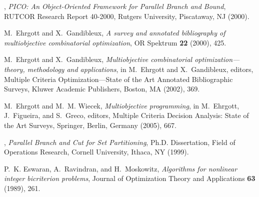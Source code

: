\begin{thebibliography}{9}



, {\em
PICO: An Object-Oriented Framework for Parallel Branch and Bound},
RUTCOR Research Report 40-2000, Rutgers University, Piscataway, NJ (2000).

{\sc M.~Ehrgott and X.~Gandibleux},
{\em A survey and annotated bibliography of multiobjective combinatorial
  optimization}, OR Spektrum \textbf{22} (2000), 425.

{\sc M.~Ehrgott and X.~Gandibleux},
{\em Multiobjective combinatorial optimization---theory, methodology and
  applications},
in M.~Ehrgott and X.~Gandibleux, editors, Multiple Criteria
  Optimization---State of the Art Annotated Bibliographic Surveys, Kluwer
  Academic Publishers, Boston, MA (2002), 369.

{\sc M.~Ehrgott and M.~M. Wiecek}, {\em Multiobjective programming}, 
in M.~Ehrgott, J.~Figueira, and S.~Greco, editors, Multiple
  Criteria Decision Analysis: State of the Art Surveys, Springer, Berlin,
  Germany (2005), 667.

,
{\em Parallel Branch and Cut for Set Partitioning},
Ph.D. Dissertation, Field of Operations Research,
Cornell University, Ithaca, NY (1999).

{\sc P.~K. Eswaran, A.~Ravindran, and H.~Moskowitz},
{\em Algorithms for nonlinear integer bicriterion problems},
Journal of Optimization Theory and Applications \textbf{63} (1989), 261.




\end{thebibliography}
